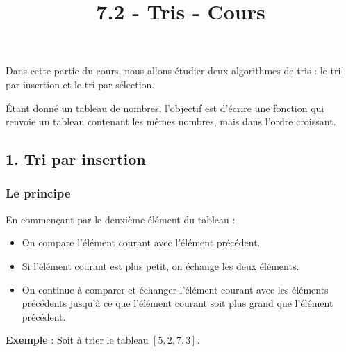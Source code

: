 \documentclass[
  french,
  a4paper,
  DIV=11,
  numbers=noendperiod]{scrartcl}
\title{7.2 - Tris - Cours}
\author{}
\date{}
\providecommand{\tightlist}{%
  \setlength{\itemsep}{0pt}\setlength{\parskip}{0pt}}
\begin{document}
\maketitle


Dans cette partie du cours, nous allons étudier deux algorithmes de tris
: le tri par insertion et le tri par sélection.

Étant donné un tableau de nombres, l'objectif est d'écrire une fonction
qui renvoie un tableau contenant les mêmes nombres, mais dans l'ordre
croissant.

\subsection{1. Tri par insertion}\label{tri-par-insertion}

\subsubsection{Le principe}\label{le-principe}

\begin{tcolorbox}[enhanced jigsaw, arc=.35mm, bottomrule=.15mm, bottomtitle=1mm, breakable, colback=white, colbacktitle=quarto-callout-important-color!10!white, colframe=quarto-callout-important-color-frame, coltitle=black, left=2mm, leftrule=.75mm, opacityback=0, opacitybacktitle=0.6, rightrule=.15mm, title=\textcolor{quarto-callout-important-color}{\faExclamation}\hspace{0.5em}{Principe de l'algorithme}, titlerule=0mm, toprule=.15mm, toptitle=1mm]

En commençant par le deuxième élément du tableau :

\begin{itemize}
\tightlist
\item
  On compare l'élément courant avec l'élément précédent.
\item
  Si l'élément courant est plus petit, on échange les deux éléments.
\item
  On continue à comparer et échanger l'élément courant avec les éléments
  précédents jusqu'à ce que l'élément courant soit plus grand que
  l'élément précédent.
\end{itemize}

\end{tcolorbox}

\protect{}\label{insertion}

\textbf{Exemple} : Soit à trier le tableau \([5,2,7,3]\).
\end{document}
